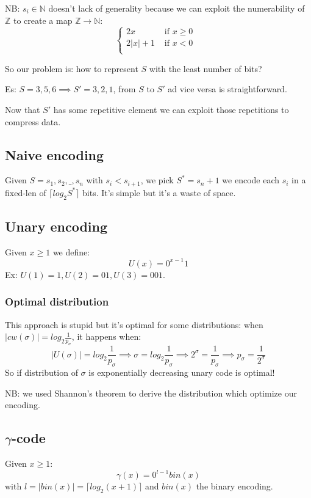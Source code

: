 NB: $s_i \in \mathbb{N}$ doesn't lack of generality because we can exploit the numerability of $\mathbb{Z}$ to create a map $\mathbb{Z} \xrightarrow{} \mathbb{N}$:
$$
\begin{cases}
    2x & \text{ if $x \geq 0$ } \\
    2|x| + 1 & \text{ if $x < 0$ } \\
\end{cases}
$$

So our problem is: how to represent $S$ with the least number of bits?

Es: $S = 3, 5, 6 \implies S' = 3, 2, 1$, from $S$ to $S'$ ad vice versa is straightforward.

Now that $S'$ has some repetitive element we can exploit those repetitions to compress data.

\subsection{Naive encoding}
Given $S = s_1, s_2, \_, s_n$ with $s_i < s_{i+1}$, we pick $S^* = s_n + 1$ we encode each $s_i$ in a fixed-len of $\lceil log_2 S^* \rceil$ bits.
It's simple but it's a waste of space.

\subsection{Unary encoding}
Given $x \geq 1$ we define:
$$
    U(x) = 0^{x-1} 1
$$
Ex: $U(1) = 1, U(2) = 01, U(3) = 001$.

\subsubsection{Optimal distribution}
This approach is stupid but it's optimal for some distributions: when $|cw(\sigma)| = log_2 \frac{1}{p_{\sigma}}$, it happens when:
$$
    |U(\sigma)| = log_2 \frac{1}{p_{\sigma}} \implies \sigma = log_2 \frac{1}{p_{\sigma}} \implies 2^{\sigma} = \frac{1}{p_{\sigma}} \implies p_{\sigma} = \frac{1}{2^{\sigma}}
$$
So if distribution of $\sigma$ is exponentially decreasing unary code is optimal!

NB: we used Shannon's theorem to derive the distribution which optimize our encoding.

\subsection{$\gamma$-code}
Given $x \geq 1$:
$$
    \gamma(x) = 0^{l-1} bin(x)
$$
with $l = |bin(x)| = \lceil log_2 (x+1) \rceil$ and $bin(x)$ the binary encoding.

